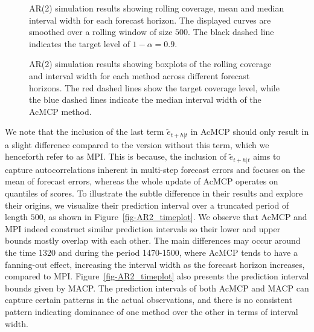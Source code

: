 \documentclass[
  11pt,
  a4paper,
]{article}
\theoremstyle{plain}
\theoremstyle{remark}
\begin{document}
\begin{figure}


\caption{\label{fig-AR2_cov}AR(2) simulation results showing rolling
coverage, mean and median interval width for each forecast horizon. The
displayed curves are smoothed over a rolling window of size \(500\). The
black dashed line indicates the target level of \(1-\alpha=0.9\).}

\end{figure}%

\begin{figure}


\caption{\label{fig-AR2_box}AR(2) simulation results showing boxplots of
the rolling coverage and interval width for each method across different
forecast horizons. The red dashed lines show the target coverage level,
while the blue dashed lines indicate the median interval width of the
AcMCP method.}

\end{figure}%

We note that the inclusion of the last term \(\tilde{e}_{t+h|t}\) in
AcMCP should only result in a slight difference compared to the version
without this term, which we henceforth refer to as MPI. This is because,
the inclusion of \(\tilde{e}_{t+h|t}\) aims to capture autocorrelations
inherent in multi-step forecast errors and focuses on the mean of
forecast errors, whereas the whole update of AcMCP operates on quantiles
of scores. To illustrate the subtle difference in their results and
explore their origins, we visualize their prediction interval over a
truncated period of length \(500\), as shown in
Figure~\ref{fig-AR2_timeplot}. We observe that AcMCP and MPI indeed
construct similar prediction intervals so their lower and upper bounds
mostly overlap with each other. The main differences may occur around
the time 1320 and during the period 1470-1500, where AcMCP tends to have
a fanning-out effect, increasing the interval width as the forecast
horizon increases, compared to MPI. Figure~\ref{fig-AR2_timeplot} also
presents the prediction interval bounds given by MACP. The prediction
intervals of both AcMCP and MACP can capture certain patterns in the
actual observations, and there is no consistent pattern indicating
dominance of one method over the other in terms of interval width.
\end{document}

